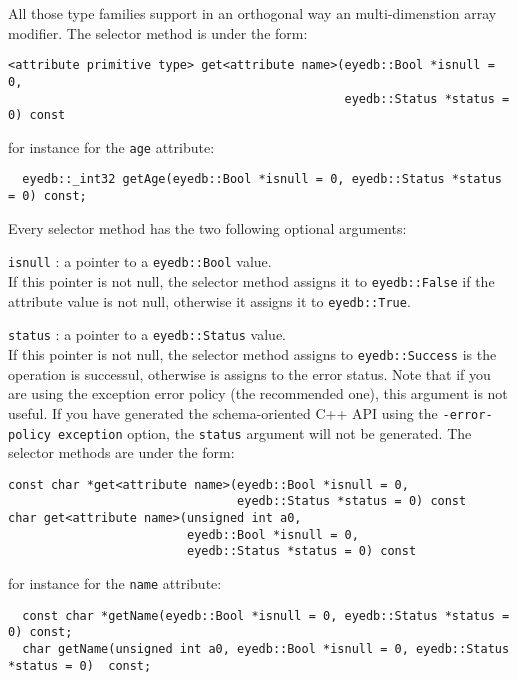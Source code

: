 All those type families support in an orthogonal way an multi-dimenstion
array modifier.
The selector method is under the form:
\verbsize
\begin{verbatim}
<attribute primitive type> get<attribute name>(eyedb::Bool *isnull = 0,
                                               eyedb::Status *status = 0) const
\end{verbatim}
\normalsize
for instance for the \texttt{age} attribute:
\verbsize
\begin{verbatim}
  eyedb::_int32 getAge(eyedb::Bool *isnull = 0, eyedb::Status *status = 0) const;
\end{verbatim}
\normalsize
Every selector method has the two following optional arguments:
\be
\item \texttt{isnull} : a pointer to a \texttt{eyedb::Bool} value.\\
If this pointer is not null, the selector method assigns it to \texttt{eyedb::False}
if the attribute value is not null, otherwise it assigns it to \texttt{eyedb::True}.
\item \texttt{status} : a pointer to a \texttt{eyedb::Status} value.\\
If this pointer is not null, the selector method assigns to \texttt{eyedb::Success}
is the operation is successul, otherwise is assigns to the error status.
Note that if you are using the exception error policy (the recommended
one), this argument is not useful. If you have generated the schema-oriented
C++ API using the \texttt{-error-policy exception} option, the
\texttt{status} argument will not be generated.
\ee
{}
The selector methods are under the form:
\verbsize
\begin{verbatim}
const char *get<attribute name>(eyedb::Bool *isnull = 0,
                                eyedb::Status *status = 0) const
char get<attribute name>(unsigned int a0,
                         eyedb::Bool *isnull = 0,
                         eyedb::Status *status = 0) const
\end{verbatim}
\normalsize
for instance for the \texttt{name} attribute:
\verbsize
\begin{verbatim}
  const char *getName(eyedb::Bool *isnull = 0, eyedb::Status *status = 0) const;
  char getName(unsigned int a0, eyedb::Bool *isnull = 0, eyedb::Status *status = 0)  const;
\end{verbatim}
\normalsize
